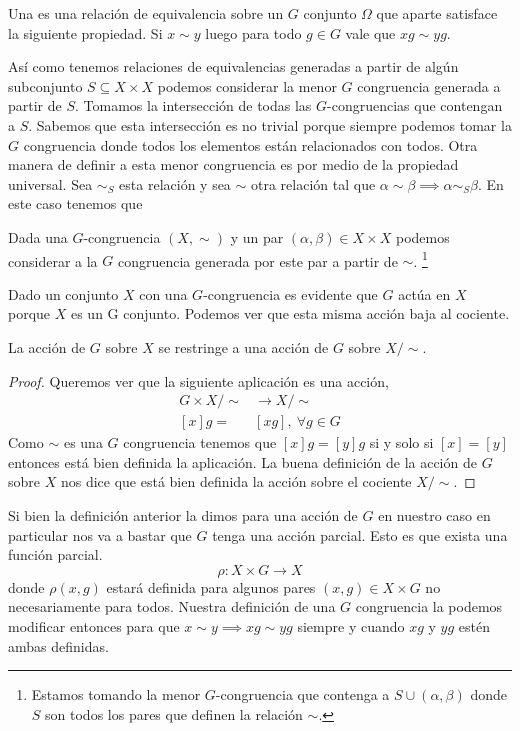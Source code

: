 \documentclass[tesis.tex]{subfiles}
\begin{document}
\begin{deff}
    Una  es una relación de equivalencia sobre un $G$ conjunto $\Omega$ que aparte satisface la siguiente propiedad.
    Si $x \sim y$ luego para todo $g \in G$ vale que $xg \sim yg$.
\end{deff}

Así como tenemos relaciones de equivalencias generadas a partir de algún subconjunto $S \subseteq X \times X$ podemos considerar la menor $G$ congruencia generada a partir de $S$.
Tomamos la intersección de todas las $G$-congruencias que contengan a $S$. 
Sabemos que esta intersección es no trivial porque siempre podemos tomar la $G$ congruencia donde todos los elementos están relacionados con todos.
Otra manera de definir a esta menor congruencia es por medio de la propiedad universal.
Sea $\sim_S$ esta relación y sea $\sim$ otra relación tal que $\alpha \sim \beta \implies \alpha \sim_S \beta$. 
En este caso tenemos que


\begin{deff}
	Dada una $G$-congruencia $(X, \sim)$ y un par $(\alpha, \beta) \in X \times X$ podemos considerar a la $G$ congruencia generada por este par a partir de $\sim$.
	\footnote{Estamos tomando la menor $G$-congruencia que contenga a $S \cup (\alpha, \beta)$ donde $S$ son todos los pares que definen la relación $\sim$.}
\end{deff}

Dado un conjunto $X$ con una $G$-congruencia es evidente que $G$ actúa en $X$ porque $X$ es un G conjunto. 
Podemos ver que esta misma acción baja al cociente.
\begin{lema}\label{lema-accion-GCong-cociente}
	La acción de $G$ sobre $X$ se restringe a una acción de $G$ sobre $X / \sim.$
\end{lema}
\begin{proof}
	Queremos ver que la siguiente aplicación es una acción,
	\begin{align*}
	G \times X/\sim &\to X/ \sim \\
	[x]g =& [xg], \ \forall g \in G
	\end{align*}
	 Como $\sim$ es una $G$ congruencia tenemos que $[x]g = [y]g$ si y solo si $[x] = [y]$ entonces está bien definida la aplicación.
	 La buena definición de la acción de $G$ sobre $X$ nos dice que está bien definida la acción sobre el cociente $X/\sim$.
\end{proof}

Si bien la definición anterior la dimos para una acción de $G$ en nuestro caso en particular nos va a bastar que $G$ tenga una acción parcial. 
Esto es que exista una función parcial.
\begin{equation*}
\rho: X \times G \to X
\end{equation*}
donde $\rho(x,g)$ estará definida para algunos pares $(x,g) \in X \times G$ no necesariamente para todos.
Nuestra definición de una $G$ congruencia la podemos modificar entonces para que  $x \sim y \implies xg \sim yg$ siempre y cuando $xg$ y $yg$ estén ambas definidas.
\end{document}
